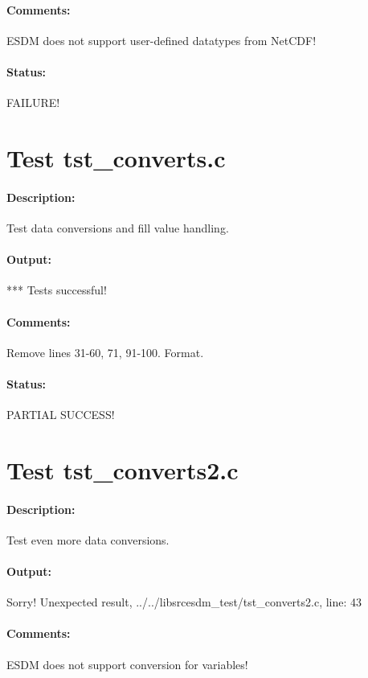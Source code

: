 \paragraph{Comments:} ESDM does not support user-defined datatypes from NetCDF!

\paragraph{Status:} FAILURE!

\section{Test tst\_converts.c}

\paragraph{Description:} Test data conversions and fill value handling.

\paragraph{Output:} *** Tests successful!

\paragraph{Comments:} Remove lines 31-60, 71, 91-100. Format.

\paragraph{Status:} PARTIAL SUCCESS!

\section{Test tst\_converts2.c}

\paragraph{Description:} Test even more data conversions.

\paragraph{Output:} Sorry! Unexpected result, ../../libsrcesdm\_test/tst\_converts2.c, line: 43

\paragraph{Comments:} ESDM does not support conversion for variables!

